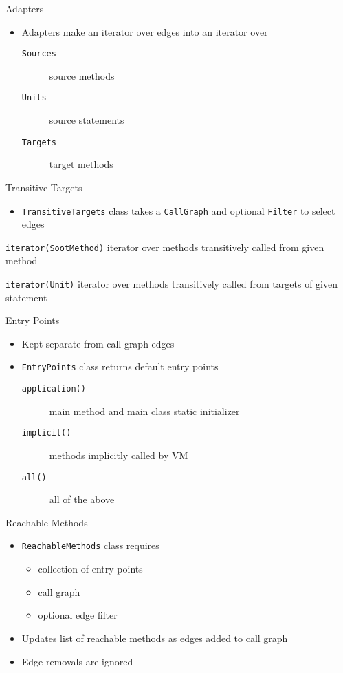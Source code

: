 \begin{slide}{Adapters}
\begin{itemize}
\item Adapters make an iterator over edges into an iterator over
\begin{description}
\item[{\tt Sources}] source methods
\item[{\tt Units}] source statements
\item[{\tt Targets}] target methods
\end{description}
\end{itemize}
\end{slide}

\begin{slide}{Transitive Targets}
\begin{itemize}
\item {\tt TransitiveTargets} class takes a {\tt CallGraph} and
optional {\tt Filter} to select edges
\end{itemize}
\begin{description}
\item {\tt iterator(SootMethod)} iterator over methods transitively
called from given method
\item {\tt iterator(Unit)} iterator over methods transitively
called from targets of given statement
\end{description}
\end{slide}

\begin{slide}{Entry Points}
\begin{itemize}
\item Kept separate from call graph edges
\item {\tt EntryPoints} class returns default entry points
\begin{description}
\item[\tt application()] main method and main class static initializer
\item[\tt implicit()] methods implicitly called by VM
\item[\tt all()] all of the above
\end{description}
\end{itemize}
\end{slide}

\begin{slide}{Reachable Methods}
\begin{itemize}
\item {\tt ReachableMethods} class requires
\begin{itemize}
\item collection of entry points
\item call graph
\item optional edge filter
\end{itemize}
\item Updates list of reachable methods as edges added to call graph
\item Edge removals are ignored
\end{itemize}
\end{slide}

